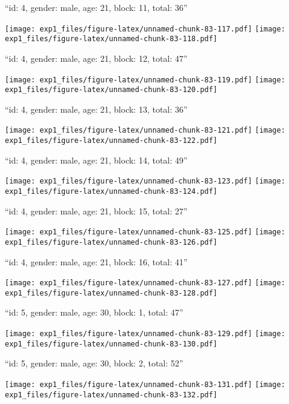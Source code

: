 \documentclass[11pt,,]{article}
\begin{document}
\newpage
[1] 

``id: 4, gender: male, age: 21, block: 11, total: 36''

\texttt{[image: exp1\_files/figure-latex/unnamed-chunk-83-117.pdf]}
\texttt{[image: exp1\_files/figure-latex/unnamed-chunk-83-118.pdf]}

\newpage
[1] 

``id: 4, gender: male, age: 21, block: 12, total: 47''

\texttt{[image: exp1\_files/figure-latex/unnamed-chunk-83-119.pdf]}
\texttt{[image: exp1\_files/figure-latex/unnamed-chunk-83-120.pdf]}

\newpage
[1] 

``id: 4, gender: male, age: 21, block: 13, total: 36''

\texttt{[image: exp1\_files/figure-latex/unnamed-chunk-83-121.pdf]}
\texttt{[image: exp1\_files/figure-latex/unnamed-chunk-83-122.pdf]}

\newpage
[1] 

``id: 4, gender: male, age: 21, block: 14, total: 49''

\texttt{[image: exp1\_files/figure-latex/unnamed-chunk-83-123.pdf]}
\texttt{[image: exp1\_files/figure-latex/unnamed-chunk-83-124.pdf]}

\newpage
[1] 

``id: 4, gender: male, age: 21, block: 15, total: 27''

\texttt{[image: exp1\_files/figure-latex/unnamed-chunk-83-125.pdf]}
\texttt{[image: exp1\_files/figure-latex/unnamed-chunk-83-126.pdf]}

\newpage
[1] 

``id: 4, gender: male, age: 21, block: 16, total: 41''

\texttt{[image: exp1\_files/figure-latex/unnamed-chunk-83-127.pdf]}
\texttt{[image: exp1\_files/figure-latex/unnamed-chunk-83-128.pdf]}

\newpage
[1] 

``id: 5, gender: male, age: 30, block: 1, total: 47''

\texttt{[image: exp1\_files/figure-latex/unnamed-chunk-83-129.pdf]}
\texttt{[image: exp1\_files/figure-latex/unnamed-chunk-83-130.pdf]}

\newpage
[1] 

``id: 5, gender: male, age: 30, block: 2, total: 52''

\texttt{[image: exp1\_files/figure-latex/unnamed-chunk-83-131.pdf]}
\texttt{[image: exp1\_files/figure-latex/unnamed-chunk-83-132.pdf]}
\end{document}
